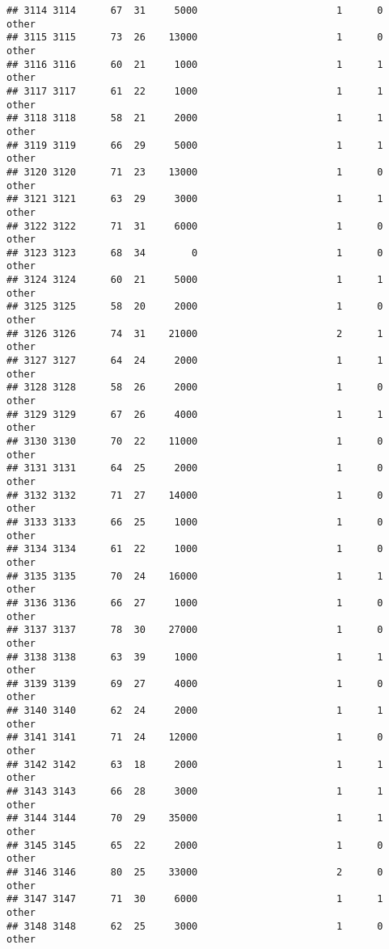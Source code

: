 \documentclass[
]{article}
\begin{document}
\begin{verbatim}
## 3114 3114      67  31     5000                        1      0    other
## 3115 3115      73  26    13000                        1      0    other
## 3116 3116      60  21     1000                        1      1    other
## 3117 3117      61  22     1000                        1      1    other
## 3118 3118      58  21     2000                        1      1    other
## 3119 3119      66  29     5000                        1      1    other
## 3120 3120      71  23    13000                        1      0    other
## 3121 3121      63  29     3000                        1      1    other
## 3122 3122      71  31     6000                        1      0    other
## 3123 3123      68  34        0                        1      0    other
## 3124 3124      60  21     5000                        1      1    other
## 3125 3125      58  20     2000                        1      0    other
## 3126 3126      74  31    21000                        2      1    other
## 3127 3127      64  24     2000                        1      1    other
## 3128 3128      58  26     2000                        1      0    other
## 3129 3129      67  26     4000                        1      1    other
## 3130 3130      70  22    11000                        1      0    other
## 3131 3131      64  25     2000                        1      0    other
## 3132 3132      71  27    14000                        1      0    other
## 3133 3133      66  25     1000                        1      0    other
## 3134 3134      61  22     1000                        1      0    other
## 3135 3135      70  24    16000                        1      1    other
## 3136 3136      66  27     1000                        1      0    other
## 3137 3137      78  30    27000                        1      0    other
## 3138 3138      63  39     1000                        1      1    other
## 3139 3139      69  27     4000                        1      0    other
## 3140 3140      62  24     2000                        1      1    other
## 3141 3141      71  24    12000                        1      0    other
## 3142 3142      63  18     2000                        1      1    other
## 3143 3143      66  28     3000                        1      1    other
## 3144 3144      70  29    35000                        1      1    other
## 3145 3145      65  22     2000                        1      0    other
## 3146 3146      80  25    33000                        2      0    other
## 3147 3147      71  30     6000                        1      1    other
## 3148 3148      62  25     3000                        1      0    other

\end{verbatim}
\end{document}
